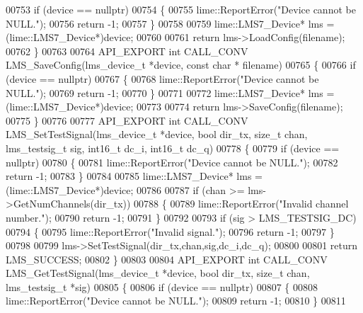 \begin{DoxyCode}
00753     \textcolor{keywordflow}{if} (device == \textcolor{keyword}{nullptr})
00754     \{
00755         lime::ReportError(\textcolor{stringliteral}{"Device cannot be NULL."});
00756         \textcolor{keywordflow}{return} -1;
00757     \}
00758 
00759     lime::LMS7_Device* lms = (lime::LMS7_Device*)device;
00760 
00761     \textcolor{keywordflow}{return} lms->LoadConfig(filename);
00762 \}
00763 
00764 API_EXPORT \textcolor{keywordtype}{int} CALL_CONV LMS_SaveConfig(lms_device_t *device, \textcolor{keyword}{const} \textcolor{keywordtype}{char} *
      filename)
00765 \{
00766     \textcolor{keywordflow}{if} (device == \textcolor{keyword}{nullptr})
00767     \{
00768         lime::ReportError(\textcolor{stringliteral}{"Device cannot be NULL."});
00769         \textcolor{keywordflow}{return} -1;
00770     \}
00771 
00772     lime::LMS7_Device* lms = (lime::LMS7_Device*)device;
00773 
00774     \textcolor{keywordflow}{return} lms->SaveConfig(filename);
00775 \}
00776 
00777 API_EXPORT \textcolor{keywordtype}{int} CALL_CONV LMS_SetTestSignal(lms_device_t *device, \textcolor{keywordtype}{bool} dir_tx, \textcolor{keywordtype}{size\_t} 
      chan, lms_testsig_t sig, int16\_t dc_i, int16\_t dc_q)
00778 \{
00779     \textcolor{keywordflow}{if} (device == \textcolor{keyword}{nullptr})
00780     \{
00781         lime::ReportError(\textcolor{stringliteral}{"Device cannot be NULL."});
00782         \textcolor{keywordflow}{return} -1;
00783     \}
00784 
00785     lime::LMS7_Device* lms = (lime::LMS7_Device*)device;
00786 
00787     \textcolor{keywordflow}{if} (chan >= lms->GetNumChannels(dir\_tx))
00788     \{
00789         lime::ReportError(\textcolor{stringliteral}{"Invalid channel number."});
00790         \textcolor{keywordflow}{return} -1;
00791     \}
00792 
00793     \textcolor{keywordflow}{if} (sig > LMS_TESTSIG_DC)
00794     \{
00795         lime::ReportError(\textcolor{stringliteral}{"Invalid signal."});
00796         \textcolor{keywordflow}{return} -1;
00797     \}
00798 
00799     lms->SetTestSignal(dir\_tx,chan,sig,dc\_i,dc\_q);
00800 
00801     \textcolor{keywordflow}{return} LMS_SUCCESS;
00802 \}
00803 
00804 API_EXPORT \textcolor{keywordtype}{int} CALL_CONV LMS_GetTestSignal(lms_device_t *device, \textcolor{keywordtype}{bool} dir_tx, \textcolor{keywordtype}{size\_t} 
      chan, lms_testsig_t *sig)
00805 \{
00806     \textcolor{keywordflow}{if} (device == \textcolor{keyword}{nullptr})
00807     \{
00808         lime::ReportError(\textcolor{stringliteral}{"Device cannot be NULL."});
00809         \textcolor{keywordflow}{return} -1;
00810     \}
00811 

\end{DoxyCode}
